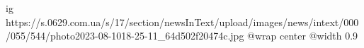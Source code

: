  
 
 
 
 

\ifcmt
  ig https://s.0629.com.ua/s/17/section/newsInText/upload/images/news/intext/000/055/544/photo2023-08-1018-25-11_64d502f20474c.jpg
  @wrap center
  @width 0.9
\fi
